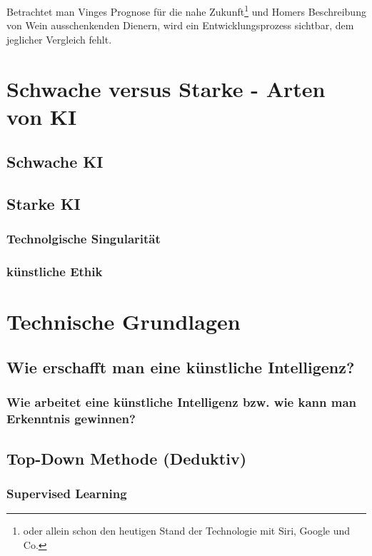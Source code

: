 \documentclass[12pt,german,ngerman]{report}
\begin{document}
Betrachtet man Vinges Prognose für die nahe Zukunft\footnote{oder allein schon den heutigen Stand der Technologie mit Siri, Google und Co.} und Homers Beschreibung von Wein ausschenkenden Dienern,
wird ein Entwicklungsprozess sichtbar, dem jeglicher Vergleich fehlt. 



\chapter{Schwache versus Starke - Arten von KI}
    \section{Schwache KI}
        \subsection{}
    \section{Starke KI}
        \subsection{Technolgische Singularität}
        \subsection{künstliche Ethik}

\chapter{Technische Grundlagen}
    \section{Wie erschafft man eine künstliche Intelligenz?}
    
        \subsection{Wie arbeitet eine künstliche Intelligenz bzw. wie kann man Erkenntnis gewinnen?}

    \section{Top-Down Methode (Deduktiv)}
        \subsection{Supervised Learning}
\end{document}
